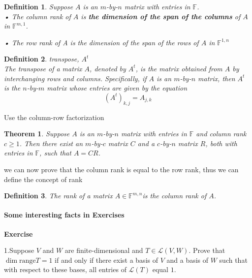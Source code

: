 \documentclass{article}
\newtheorem{theorem}{Theorem}[subsection]
\newtheorem{definition}{Definition}[subsection]
\newenvironment{exercise}{%
{\textbf{Exercise\\}
    }
}{
}
\newcommand{\FF}{\mathbb{F}}
\begin{document}
\begin{CJK}{UTF8}{gkai}
\begin{definition}
    Suppose $A$ is an $m$-by-$n$ matrix with entries in $\FF$.\\

    • The column rank of $A$ is \textbf{the dimension of the span of the columns} of $A$ in $\FF^{m,1}$.

    • The row rank of A is the dimension of the span of the rows of $A$ in $\FF^{1,n}$

\end{definition}


\begin{definition}
    transpose, $A^t$\\

    The transpose of a matrix $A$, denoted by $A^t$, is the matrix obtained from $A$ by interchanging rows and columns. Specifically, if $A$ is an $m$-by-$n$ matrix, then $A^t$ is the $n$-by-$m$ matrix whose entries are given by the equation
    \[(A^t)_{k,j} = A_{j,k}\]
\end{definition}

Use the column-row factorization

\begin{theorem}
    
    Suppose $A$ is an $m$-by-$n$ matrix with entries in $\FF$ and column rank $c \geq 1$. Then there exist an $m$-by-$c$ matrix $C$ and a $c$-by-$n$ matrix $R$, both with entries in $\FF$, such that $A = CR$.
    
\end{theorem}

we can now prove that the column rank is equal to the row rank, thus we can define the concept of rank

\begin{definition}

    The rank of a matrix $A\in \FF^{m,n}$is the column rank of $A$.
\end{definition}

\paragraph{Some interesting facts in Exercises\\}

\begin{exercise}
    
1.Suppose $V$ and $W$ are finite-dimensional and $T \in \mathcal{L}(V,W)$. Prove that $\dim \text{range} T = 1$ if and only if there exist a basis of $V$ and a basis of $W$ such that with respect to these bases, all entries of $\mathcal{L}(T)$ equal $1$.\\
\end{exercise}


\end{CJK}
\end{document}
